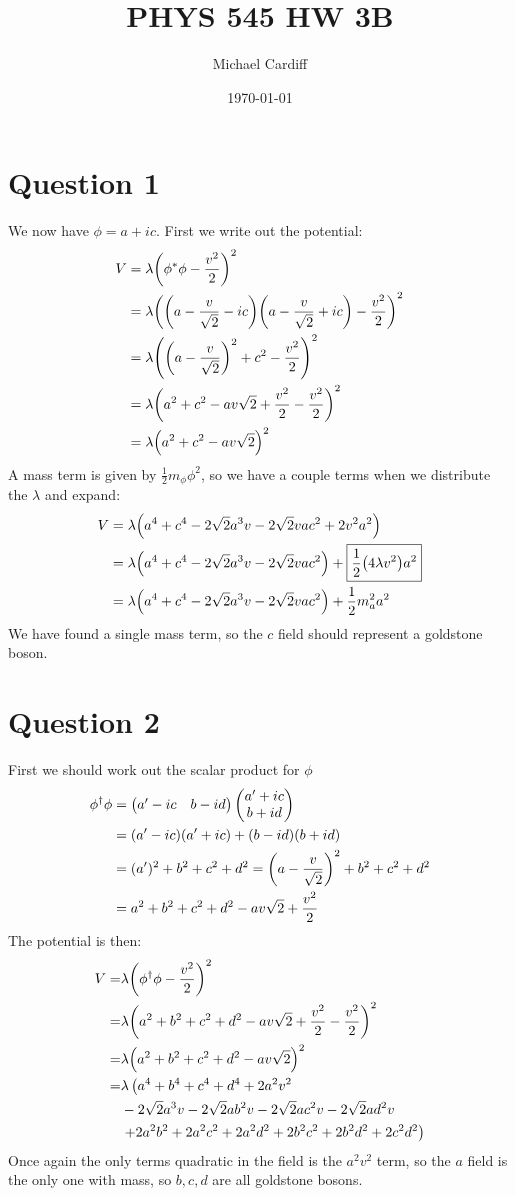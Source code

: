 \documentclass[12pt]{article}
\title{\vspace{-3em}PHYS 545 HW 3B}
\author{Michael Cardiff}
\date{\today}
\begin{document}
\maketitle
\section*{Question 1}
We now have $\phi = a + ic$. First we write out the potential:
\begin{align*}
  V&=\lambda\qty(\phi^*\phi-\frac{v^2}{2})^2\\
  &=\lambda\qty(\qty(a-\frac{v}{\sqrt{2}}-ic)
  \qty(a-\frac{v}{\sqrt{2}}+ic)-\frac{v^2}{2})^2\\
  &=\lambda\qty(\qty(a-\frac{v}{\sqrt{2}})^2+c^2-\frac{v^2}{2})^2\\
  &=\lambda\qty(a^2+c^2-av\sqrt{2}+\frac{v^2}{2}-\frac{v^2}{2})^2\\
  &=\lambda\qty(a^2+c^2-av\sqrt{2})^2
\end{align*}
A mass term is given by $\frac{1}{2}m_\phi\phi^2$, so we have a couple terms when we distribute the $\lambda$ and expand:
\begin{align*}
  V&=\lambda\qty(a^4+c^4-2\sqrt{2}a^3v-2\sqrt{2}vac^2+2v^2a^2)\\
  &=\lambda\qty(a^4+c^4-2\sqrt{2}a^3v-2\sqrt{2}vac^2)+
  \boxed{\frac{1}{2}\qty(4\lambda v^2)a^2}\\
  &=\lambda\qty(a^4+c^4-2\sqrt{2}a^3v-2\sqrt{2}vac^2)+
  \frac{1}{2}m_a^2a^2
\end{align*}
We have found a single mass term, so the $c$ field should represent a goldstone boson. 
\section*{Question 2}
First we should work out the scalar product for $\phi$
\begin{align*}
  \phi^\dag\phi&=\pmqty{a'-ic & b-id}\pmqty{a'+ic\\b+id}\\
  &=(a'-ic)(a'+ic)+(b-id)(b+id)\\
  &=(a')^2+b^2+c^2+d^2
  =\qty(a-\frac{v}{\sqrt{2}})^2+b^2+c^2+d^2\\
  &=a^2+b^2+c^2+d^2-av\sqrt{2}+\frac{v^2}{2}
\end{align*}
The potential is then:
\begin{align*}
  V=&\lambda\qty(\phi^\dag\phi-\frac{v^2}{2})^2\\
  =&\lambda\qty(a^2+b^2+c^2+d^2-av\sqrt{2}+\frac{v^2}{2}-\frac{v^2}{2})^2\\
  =&\lambda\qty(a^2+b^2+c^2+d^2-av\sqrt{2})^2\\
  =&\lambda\left(a^4+b^4+c^4+d^4+2a^2v^2\right.\\
  &-2\sqrt{2}a^3v-2\sqrt{2}ab^2v-2\sqrt{2}ac^2v-2\sqrt{2}ad^2v\\
  &\left.+2a^2b^2+2a^2c^2+2a^2d^2+2b^2c^2+2b^2d^2+2c^2d^2\right)
\end{align*}
Once again the only terms quadratic in the field is the $a^2v^2$ term, so the $a$ field is the only one with mass, so $b,c,d$ are all goldstone bosons.
\end{document}
